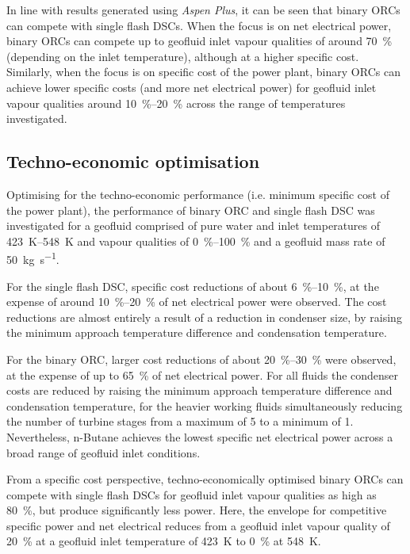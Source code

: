         In line with results generated using \emph{Aspen Plus}, it can be seen that binary \acp{ORC} can compete with single flash \acp{DSC}. When the focus is on net electrical power, binary \acp{ORC} can compete up to geofluid inlet vapour qualities of around \qty{70}{\percent} (depending on the inlet temperature), although at a higher specific cost. Similarly, when the focus is on specific cost of the power plant, binary \acp{ORC} can achieve lower specific costs (and more net electrical power) for geofluid inlet vapour qualities around \qtyrange{10}{20}{\percent} across the range of temperatures investigated.

    
    \subsection{Techno-economic optimisation}
        Optimising for the techno-economic performance (i.e. minimum specific cost of the power plant), the performance of binary \ac{ORC} and single flash \ac{DSC} was investigated for a geofluid comprised of pure water and inlet temperatures of \qtyrange{423}{548}{\K} and vapour qualities of \qtyrange{0}{100}{\percent} and a geofluid mass rate of \qty{50}{\kg\per\s}.

        For the single flash \ac{DSC}, specific cost reductions of about \qtyrange{6}{10}{\percent}, at the expense of around \qtyrange{10}{20}{\percent} of net electrical power were observed. The cost reductions are almost entirely a result of a reduction in condenser size, by raising the minimum approach temperature difference and condensation temperature.

        For the binary \ac{ORC}, larger cost reductions of about \qtyrange{20}{30}{\percent} were observed, at the expense of up to \qty{65}{\percent} of net electrical power. For all fluids the condenser costs are reduced by raising the minimum approach temperature difference and condensation temperature, for the heavier working fluids simultaneously reducing the number of turbine stages from a maximum of \num{5} to a minimum of \num{1}. Nevertheless, n-Butane achieves the lowest specific net electrical power across a broad range of geofluid inlet conditions.

        From a specific cost perspective, techno-economically optimised binary \acp{ORC} can compete with single flash \acp{DSC} for geofluid inlet vapour qualities as high as \qty{80}{\percent}, but produce significantly less power. Here, the envelope for competitive specific power and net electrical reduces from a geofluid inlet vapour quality of \qty{20}{\percent} at a geofluid inlet temperature of \qty{423}{\K} to \qty{0}{\percent} at \qty{548}{\K}. 
        
